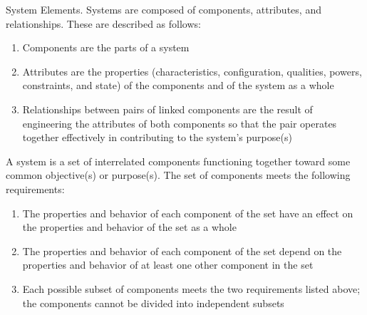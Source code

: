 System Elements. Systems are composed of components, attributes, and relationships. These are described as follows:
\begin{enumerate}
	\item Components are the parts of a system
	\item Attributes are the properties (characteristics, configuration, qualities, powers, constraints, and state) of the components and of the system as a whole
	\item Relationships between pairs of linked components are the result of engineering the attributes of both components so that the pair operates together effectively in contributing to the system’s purpose(s)
\end{enumerate}

A system is a set of interrelated components functioning together toward some common objective(s) or purpose(s). The set of components meets the following requirements:
\begin{enumerate}
	\item The properties and behavior of each component of the set have an effect on the properties and behavior of the set as a whole
	\item The properties and behavior of each component of the set depend on the properties and behavior of at least one other component in the set
	\item Each possible subset of components meets the two requirements listed above; the components cannot be divided into independent subsets
\end{enumerate}

